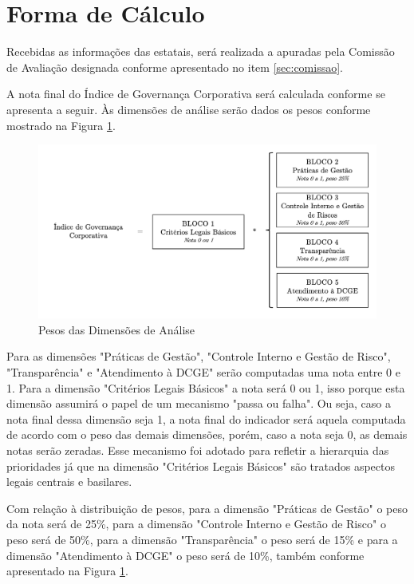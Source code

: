 \section{Forma de Cálculo}

Recebidas as informações das estatais, será realizada a apuradas pela Comissão de Avaliação designada conforme apresentado no item \ref{sec:comissao}. 

A nota final do Índice de Governança Corporativa será calculada conforme se apresenta a seguir. Às dimensões de análise serão dados os pesos conforme mostrado na Figura \ref{fig:pesos-dimensoes}.

\begin{figure}[h]
\label{fig:pesos-dimensoes}
\caption{Pesos das Dimensões de Análise}
\centering
\includegraphics[width=\textwidth]{figures/ig-perspectiva1.png}
\end{figure}

Para as dimensões "Práticas de Gestão", "Controle Interno e Gestão de Risco", "Transparência" e "Atendimento à DCGE" serão computadas uma nota entre 0 e 1. Para a dimensão "Critérios Legais Básicos" a nota será 0 ou 1, isso porque esta dimensão assumirá o papel de um mecanismo "passa ou falha". Ou seja, caso a nota final dessa dimensão seja 1, a nota final do indicador será aquela computada de acordo com o peso das demais dimensões, porém, caso a nota seja 0, as demais notas serão zeradas. Esse mecanismo foi adotado para refletir a hierarquia das prioridades já que na dimensão "Critérios Legais Básicos" são tratados aspectos legais centrais e basilares.

Com relação à distribuição de pesos, para a dimensão "Práticas de Gestão" o peso da nota será de 25\%, para a dimensão "Controle Interno e Gestão de Risco" o peso será de 50\%, para a dimensão "Transparência" o peso será de 15\% e para a dimensão "Atendimento à DCGE" o peso será de 10\%, também conforme apresentado na Figura \ref{fig:pesos-dimensoes}.

